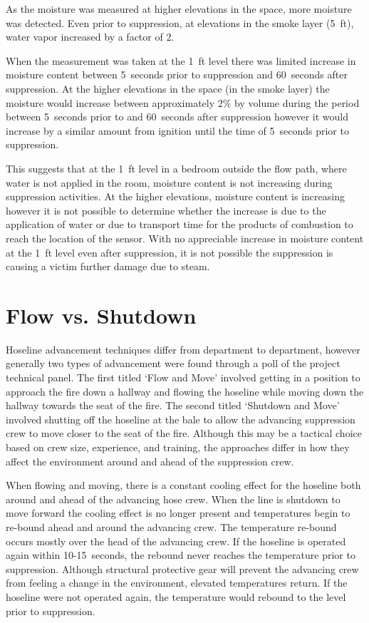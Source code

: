 \documentclass[12pt,oneside]{book}
\begin{document}
As the moisture was measured at higher elevations in the space, more moisture was detected. Even prior to suppression, at elevations in the smoke layer (5~ft), water vapor increased by a factor of 2. 

When the measurement was taken at the 1~ft level there was limited increase in moisture content between 5~seconds prior to suppression and 60~seconds after suppression. At the higher elevations in the space (in the smoke layer) the moisture would increase between approximately 2\% by volume during the period between 5~seconds prior to and 60~seconds after suppression however it would increase by a similar amount from ignition until the time of 5~seconds prior to suppression. 

This suggests that at the 1~ft level in a bedroom outside the flow path, where water is not applied in the room, moisture content is not increasing during suppression activities. At the higher elevations, moisture content is increasing however it is not possible to determine whether the increase is due to the application of water or due to transport time for the products of combustion to reach the location of the sensor. With no appreciable increase in moisture content at the 1~ft level even after suppression, it is not possible the suppression is causing a victim further damage due to steam. 

\section{Flow vs. Shutdown} \label{tc:flow_vs_shutdown}
Hoseline advancement techniques differ from department to department, however generally two types of advancement were found through a poll of the project technical panel. The first titled `Flow and Move' involved getting in a position to approach the fire down a hallway and flowing the hoseline while moving down the hallway towards the seat of the fire. The second titled `Shutdown and Move' involved shutting off the hoseline at the bale to allow the advancing suppression crew to move closer to the seat of the fire. Although this may be a tactical choice based on crew size, experience, and training, the approaches differ in how they affect the environment around and ahead of the suppression crew. 

When flowing and moving, there is a constant cooling effect for the hoseline both around and ahead of the advancing hose crew. When the line is shutdown to move forward the cooling effect is no longer present and temperatures begin to re-bound ahead and around the advancing crew. The temperature re-bound occurs mostly over the head of the advancing crew. If the hoseline is operated again within 10-15~seconds, the rebound never reaches the temperature prior to suppression. Although structural protective gear will prevent the advancing crew from feeling a change in the environment, elevated temperatures return. If the hoseline were not operated again, the temperature would rebound to the level prior to suppression.
\end{document}
